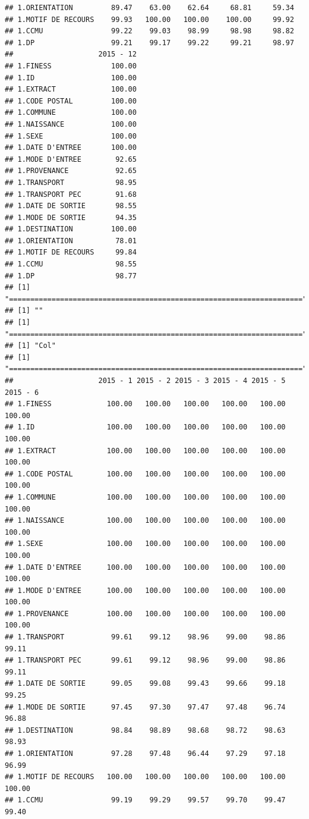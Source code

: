 \documentclass[]{article}
\begin{document}
\begin{verbatim}
## 1.ORIENTATION         89.47    63.00    62.64     68.81     59.34
## 1.MOTIF DE RECOURS    99.93   100.00   100.00    100.00     99.92
## 1.CCMU                99.22    99.03    98.99     98.98     98.82
## 1.DP                  99.21    99.17    99.22     99.21     98.97
##                    2015 - 12
## 1.FINESS              100.00
## 1.ID                  100.00
## 1.EXTRACT             100.00
## 1.CODE POSTAL         100.00
## 1.COMMUNE             100.00
## 1.NAISSANCE           100.00
## 1.SEXE                100.00
## 1.DATE D'ENTREE       100.00
## 1.MODE D'ENTREE        92.65
## 1.PROVENANCE           92.65
## 1.TRANSPORT            98.95
## 1.TRANSPORT PEC        91.68
## 1.DATE DE SORTIE       98.55
## 1.MODE DE SORTIE       94.35
## 1.DESTINATION         100.00
## 1.ORIENTATION          78.01
## 1.MOTIF DE RECOURS     99.84
## 1.CCMU                 98.55
## 1.DP                   98.77
## [1] "====================================================================="
## [1] ""
## [1] "====================================================================="
## [1] "Col"
## [1] "====================================================================="
##                    2015 - 1 2015 - 2 2015 - 3 2015 - 4 2015 - 5 2015 - 6
## 1.FINESS             100.00   100.00   100.00   100.00   100.00   100.00
## 1.ID                 100.00   100.00   100.00   100.00   100.00   100.00
## 1.EXTRACT            100.00   100.00   100.00   100.00   100.00   100.00
## 1.CODE POSTAL        100.00   100.00   100.00   100.00   100.00   100.00
## 1.COMMUNE            100.00   100.00   100.00   100.00   100.00   100.00
## 1.NAISSANCE          100.00   100.00   100.00   100.00   100.00   100.00
## 1.SEXE               100.00   100.00   100.00   100.00   100.00   100.00
## 1.DATE D'ENTREE      100.00   100.00   100.00   100.00   100.00   100.00
## 1.MODE D'ENTREE      100.00   100.00   100.00   100.00   100.00   100.00
## 1.PROVENANCE         100.00   100.00   100.00   100.00   100.00   100.00
## 1.TRANSPORT           99.61    99.12    98.96    99.00    98.86    99.11
## 1.TRANSPORT PEC       99.61    99.12    98.96    99.00    98.86    99.11
## 1.DATE DE SORTIE      99.05    99.08    99.43    99.66    99.18    99.25
## 1.MODE DE SORTIE      97.45    97.30    97.47    97.48    96.74    96.88
## 1.DESTINATION         98.84    98.89    98.68    98.72    98.63    98.93
## 1.ORIENTATION         97.28    97.48    96.44    97.29    97.18    96.99
## 1.MOTIF DE RECOURS   100.00   100.00   100.00   100.00   100.00   100.00
## 1.CCMU                99.19    99.29    99.57    99.70    99.47    99.40

\end{verbatim}
\end{document}
